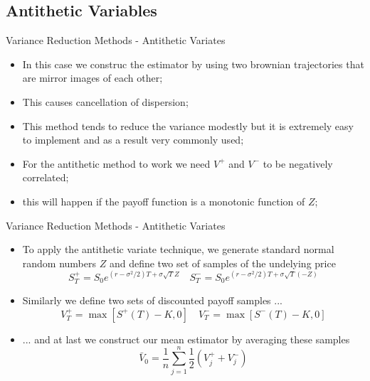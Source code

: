 \documentclass[11pt]{beamer}
\begin{document}
\subsection{Antithetic Variables}
\begin{frame}{Variance Reduction Methods - Antithetic Variates}
\begin{itemize}
\item In this case we construc the estimator by using two brownian trajectories that are mirror images of each other;
\item This causes cancellation of dispersion;
\item This method tends to reduce the variance modestly but it is extremely easy to implement and as a result very commonly used;
\item  For the antithetic method to work we need $V^+$ and $V^-$ to be negatively correlated;
\item this will happen if the payoff function is a monotonic function of $Z$;
\end{itemize}
\end{frame}
\begin{frame}{Variance Reduction Methods - Antithetic Variates}
\begin{itemize}
\item To apply the antithetic variate technique, we generate standard normal random numbers $Z$ and define two set of samples of the undelying price
$$
S^+_T = S_0e^{(r-\sigma^2/2)T + \sigma \sqrt{T} Z} \quad
S^-_T = S_0e^{(r-\sigma^2/2)T + \sigma \sqrt{T}(-Z)}
$$ 
\item Similarly we define two sets of discounted payoff samples ...
$$
V_T^+ = \max[S^+(T)-K,0 ] \quad
V_T^- = \max[S^-(T)-K,0 ]
$$
\item ... and at last we construct our mean estimator by averaging these samples
$$
\bar V_0 = \frac{1}{n} \sum\limits_{j=1}^n 
\frac{1}{2} \left( V_j^+ + V_j^- \right)  
$$ 
\end{itemize}
\end{frame}
\end{document}
